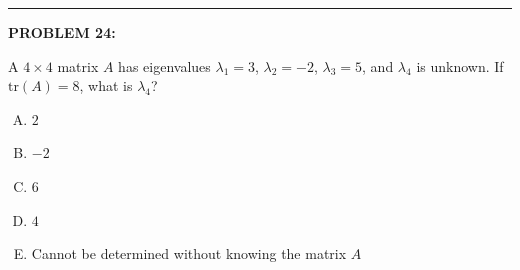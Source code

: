 \documentclass[12pt]{amsart}
\newcommand{\divider}{
  \vspace{-1em} %
  \noindent
  \raisebox{-0.15ex}{\textbullet}%
  \hspace{0.5em}%
  \rule[0.5ex]{0.95\textwidth}{1.0pt}%
  \hspace{0.5em}%
  \raisebox{-0.15ex}{\textbullet}%
  \vspace{0em} %
}
\begin{document}

\divider


{\bf PROBLEM 24:}

A $4 \times 4$ matrix $A$ has eigenvalues $\lambda_1 = 3$, $\lambda_2 = -2$, $\lambda_3 = 5$, and $\lambda_4$ is unknown. If $\text{tr}(A) = 8$, what is $\lambda_4$?

\begin{enumerate}[(A)]
\item $2$
\item $-2$
\item $6$
\item $4$
\item Cannot be determined without knowing the matrix $A$
\end{enumerate}

\end{document}
